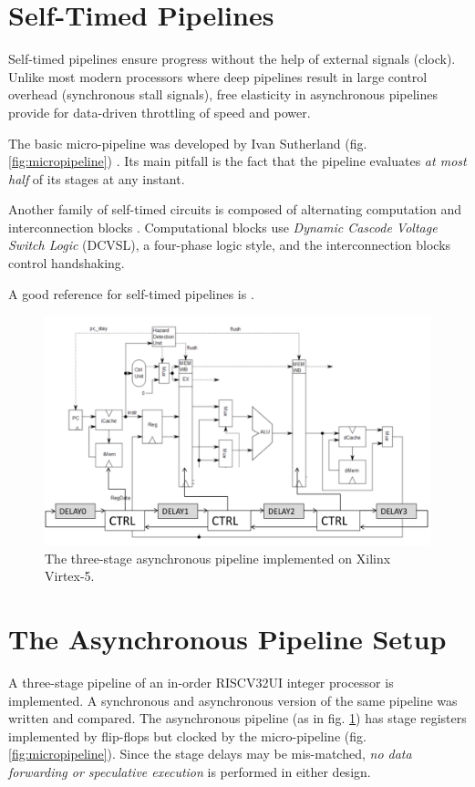 \documentclass[10pt,journal,compsoc]{IEEEtran}
\begin{document}
\section{Self-Timed Pipelines}

Self-timed pipelines ensure progress without the help of external signals
(clock). Unlike most modern processors where deep pipelines result
in large control overhead (synchronous stall signals), free elasticity in
asynchronous pipelines provide for data-driven throttling of speed and
power.

The basic micro-pipeline was developed by Ivan Sutherland (fig.
\ref{fig:micropipeline}) \cite{sutherland_cite}.
Its main pitfall is the fact that the pipeline evaluates 
\emph{at most half} of its stages at any instant.

Another family of self-timed circuits is composed of alternating computation and
interconnection blocks \cite{seger_book}. Computational blocks
use \emph{Dynamic Cascode Voltage Switch Logic} (DCVSL), a four-phase logic style,
and the interconnection blocks control handshaking.

A good reference for self-timed pipelines is \cite{micropipeline_cite}.


\begin{figure} 
	\centering
	\includegraphics[width = 0.5 \textwidth]{pipeline} 
	\caption{The three-stage asynchronous pipeline implemented on Xilinx
	Virtex-5.} 
	\label{fig:pipeline}
\end{figure}

\section{The Asynchronous Pipeline Setup}

A three-stage pipeline of an in-order RISCV32UI integer processor is
implemented. A synchronous and asynchronous
version of the same pipeline was written and compared. 
The asynchronous pipeline (as in fig. \ref{fig:pipeline}) has stage registers 
implemented by flip-flops but clocked by the micro-pipeline (fig.
\ref{fig:micropipeline}). Since the stage delays may be mis-matched, \emph{no
data forwarding or speculative execution} is performed in either design.
\end{document}
